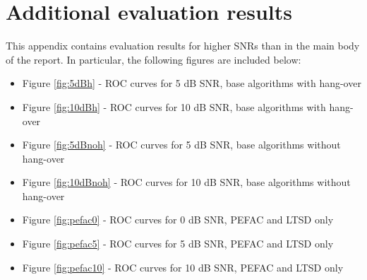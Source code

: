 
\chapter{Additional evaluation results} %

\label{AppendixA} %


This appendix contains evaluation results for higher SNRs than in the main body of the report. In particular, the following figures are included below:

\begin{itemize}
\item Figure \ref{fig:5dBh} - ROC curves for 5 dB SNR, base algorithms with hang-over
\item Figure \ref{fig:10dBh} - ROC curves for 10 dB SNR, base algorithms with hang-over
\item Figure \ref{fig:5dBnoh} - ROC curves for 5 dB SNR, base algorithms without hang-over
\item Figure \ref{fig:10dBnoh} - ROC curves for 10 dB SNR, base algorithms without hang-over
\item Figure \ref{fig:pefac0} - ROC curves for 0 dB SNR, PEFAC and LTSD only
\item Figure \ref{fig:pefac5} - ROC curves for 5 dB SNR, PEFAC and LTSD only
\item Figure \ref{fig:pefac10} - ROC curves for 10 dB SNR, PEFAC and LTSD only
\end{itemize}

